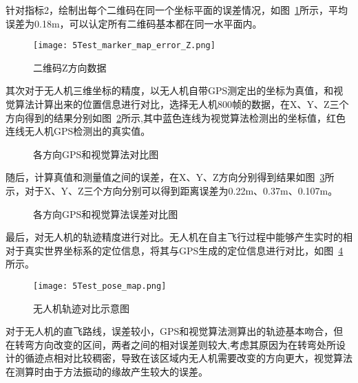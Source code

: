 针对指标2，绘制出每个二维码在同一个坐标平面的误差情况，如图~\ref{fig:5Test_marker_map_error_Z}所示，平均误差为0.18m，可以认定所有二维码基本都在同一水平面内。
\begin{figure}[H] %
  \centering
  \texttt{[image: 5Test\_marker\_map\_error\_Z.png]}
  \caption{二维码Z方向数据}
  \label{fig:5Test_marker_map_error_Z}
\end{figure}
其次对于无人机三维坐标的精度，以无人机自带GPS测定出的坐标为真值，和视觉算法计算出来的位置信息进行对比，选择无人机800帧的数据，在X、Y、Z三个方向得到的结果分别如图~\ref{fig:5Test_pose_xyz}所示,其中蓝色连线为视觉算法检测出的坐标值，红色连线无人机GPS检测出的真实值。
\begin{figure}[h]
  \centering
  \vskip0.5cm
  \caption{各方向GPS和视觉算法对比图}\label{fig:5Test_pose_xyz}
\end{figure}
随后，计算真值和测量值之间的误差，在X、Y、Z方向分别得到结果如图~\ref{fig:5Test_pose_error_xyz}所示，对于X、Y、Z三个方向分别可以得到距离误差为0.22m、0.37m、0.107m。
\begin{figure}[H]
    \centering
    \vskip0.35cm
    \vskip0.35cm
    \caption{各方向GPS和视觉算法误差对比图}\label{fig:5Test_pose_error_xyz}
\end{figure}
最后，对无人机的轨迹精度进行对比。无人机在自主飞行过程中能够产生实时的相对于真实世界坐标系的定位信息，将其与GPS生成的定位信息进行对比，如图~\ref{fig:5Test_pose_map}所示。
\begin{figure}[H] %
  \centering
  \texttt{[image: 5Test\_pose\_map.png]}
  \caption{无人机轨迹对比示意图}
  \label{fig:5Test_pose_map}
\end{figure}
对于无人机的直飞路线，误差较小，GPS和视觉算法测算出的轨迹基本吻合，但在转弯方向改变的区间，两者之间的相对误差则较大,考虑其原因为在转弯处所设计的循迹点相对比较稠密，导致在该区域内无人机需要改变的方向更大，视觉算法在测算时由于方法振动的缘故产生较大的误差。
